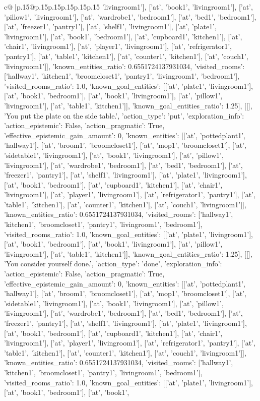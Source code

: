 \documentclass{article}
\begin{document}
{\begin{supertabular}{c@{$\;$}|p{.15\linewidth}@{}p{.15\linewidth}p{.15\linewidth}p{.15\linewidth}p{.15\linewidth}p{.15\linewidth}}
{{{'livingroom1'], ['at', 'book1', 'livingroom1'], ['at', 'pillow1', 'livingroom1'], ['at', 'wardrobe1', 'bedroom1'], ['at', 'bed1', 'bedroom1'], ['at', 'freezer1', 'pantry1'], ['at', 'shelf1', 'livingroom1'], ['at', 'plate1', 'livingroom1'], ['at', 'book1', 'bedroom1'], ['at', 'cupboard1', 'kitchen1'], ['at', 'chair1', 'livingroom1'], ['at', 'player1', 'livingroom1'], ['at', 'refrigerator1', 'pantry1'], ['at', 'table1', 'kitchen1'], ['at', 'counter1', 'kitchen1'], ['at', 'couch1', 'livingroom1']], 'known_entities_ratio': 0.6551724137931034, 'visited_rooms': ['hallway1', 'kitchen1', 'broomcloset1', 'pantry1', 'livingroom1', 'bedroom1'], 'visited_rooms_ratio': 1.0, 'known_goal_entities': [['at', 'plate1', 'livingroom1'], ['at', 'book1', 'bedroom1'], ['at', 'book1', 'livingroom1'], ['at', 'pillow1', 'livingroom1'], ['at', 'table1', 'kitchen1']], 'known_goal_entities_ratio': 1.25}}], [[], 'You put the plate on the side table.', {'action_type': 'put', 'exploration_info': {'action_epistemic': False, 'action_pragmatic': True, 'effective_epistemic_gain_amount': 0, 'known_entities': [['at', 'pottedplant1', 'hallway1'], ['at', 'broom1', 'broomcloset1'], ['at', 'mop1', 'broomcloset1'], ['at', 'sidetable1', 'livingroom1'], ['at', 'book1', 'livingroom1'], ['at', 'pillow1', 'livingroom1'], ['at', 'wardrobe1', 'bedroom1'], ['at', 'bed1', 'bedroom1'], ['at', 'freezer1', 'pantry1'], ['at', 'shelf1', 'livingroom1'], ['at', 'plate1', 'livingroom1'], ['at', 'book1', 'bedroom1'], ['at', 'cupboard1', 'kitchen1'], ['at', 'chair1', 'livingroom1'], ['at', 'player1', 'livingroom1'], ['at', 'refrigerator1', 'pantry1'], ['at', 'table1', 'kitchen1'], ['at', 'counter1', 'kitchen1'], ['at', 'couch1', 'livingroom1']], 'known_entities_ratio': 0.6551724137931034, 'visited_rooms': ['hallway1', 'kitchen1', 'broomcloset1', 'pantry1', 'livingroom1', 'bedroom1'], 'visited_rooms_ratio': 1.0, 'known_goal_entities': [['at', 'plate1', 'livingroom1'], ['at', 'book1', 'bedroom1'], ['at', 'book1', 'livingroom1'], ['at', 'pillow1', 'livingroom1'], ['at', 'table1', 'kitchen1']], 'known_goal_entities_ratio': 1.25}}], [[], 'You consider yourself done.', {'action_type': 'done', 'exploration_info': {'action_epistemic': False, 'action_pragmatic': True, 'effective_epistemic_gain_amount': 0, 'known_entities': [['at', 'pottedplant1', 'hallway1'], ['at', 'broom1', 'broomcloset1'], ['at', 'mop1', 'broomcloset1'], ['at', 'sidetable1', 'livingroom1'], ['at', 'book1', 'livingroom1'], ['at', 'pillow1', 'livingroom1'], ['at', 'wardrobe1', 'bedroom1'], ['at', 'bed1', 'bedroom1'], ['at', 'freezer1', 'pantry1'], ['at', 'shelf1', 'livingroom1'], ['at', 'plate1', 'livingroom1'], ['at', 'book1', 'bedroom1'], ['at', 'cupboard1', 'kitchen1'], ['at', 'chair1', 'livingroom1'], ['at', 'player1', 'livingroom1'], ['at', 'refrigerator1', 'pantry1'], ['at', 'table1', 'kitchen1'], ['at', 'counter1', 'kitchen1'], ['at', 'couch1', 'livingroom1']], 'known_entities_ratio': 0.6551724137931034, 'visited_rooms': ['hallway1', 'kitchen1', 'broomcloset1', 'pantry1', 'livingroom1', 'bedroom1'], 'visited_rooms_ratio': 1.0, 'known_goal_entities': [['at', 'plate1', 'livingroom1'], ['at', 'book1', 'bedroom1'], ['at', 'book1', }}}
\end{supertabular}}
\end{document}
